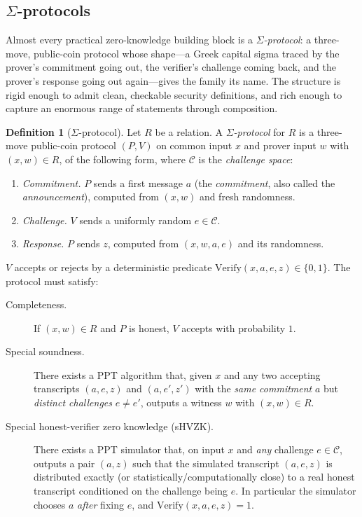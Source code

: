 \documentclass[11pt,a4paper]{article}
\theoremstyle{definition}
\newtheorem{definition}[theorem]{Definition}
\theoremstyle{remark}
\begin{document}
\subsection{\(\Sigma\)-protocols}\label{zk:subsec:sigma}

Almost every practical zero-knowledge building block is a \emph{\(\Sigma\)-protocol}: a three-move, public-coin protocol whose shape---a Greek capital sigma traced by the prover's commitment going out, the verifier's challenge coming back, and the prover's response going out again---gives the family its name. The structure is rigid enough to admit clean, checkable security definitions, and rich enough to capture an enormous range of statements through composition.

\begin{definition}[\(\Sigma\)-protocol]\label{zk:def:sigma}
Let \(R\) be a relation. A \emph{\(\Sigma\)-protocol} for \(R\) is a three-move public-coin protocol \((P,V)\) on common input \(x\) and prover input \(w\) with \((x,w)\in R\), of the following form, where \(\mathcal{C}\) is the \emph{challenge space}:
\begin{enumerate}
  \item \emph{Commitment.} \(P\) sends a first message \(a\) (the \emph{commitment}, also called the \emph{announcement}), computed from \((x,w)\) and fresh randomness.
  \item \emph{Challenge.} \(V\) sends a uniformly random \(e \in \mathcal{C}\).
  \item \emph{Response.} \(P\) sends \(z\), computed from \((x, w, a, e)\) and its randomness.
\end{enumerate}
\(V\) accepts or rejects by a deterministic predicate \(\mathrm{Verify}(x, a, e, z) \in \{0,1\}\). The protocol must satisfy:
\begin{description}
  \item[Completeness.] If \((x,w)\in R\) and \(P\) is honest, \(V\) accepts with probability \(1\).
  \item[Special soundness.] There exists a PPT algorithm that, given \(x\) and any two accepting transcripts \((a, e, z)\) and \((a, e', z')\) with the \emph{same commitment} \(a\) but \emph{distinct challenges} \(e \ne e'\), outputs a witness \(w\) with \((x,w)\in R\).
  \item[Special honest-verifier zero knowledge (sHVZK).] There exists a PPT simulator that, on input \(x\) and \emph{any} challenge \(e \in \mathcal{C}\), outputs a pair \((a, z)\) such that the simulated transcript \((a, e, z)\) is distributed exactly (or statistically/computationally close) to a real honest transcript conditioned on the challenge being \(e\). In particular the simulator chooses \(a\) \emph{after} fixing \(e\), and \(\mathrm{Verify}(x,a,e,z)=1\).
\end{description}
\end{definition}
\end{document}
